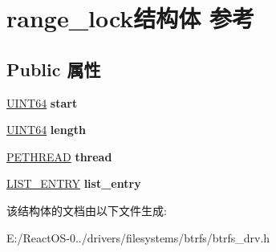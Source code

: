 \hypertarget{structrange__lock}{}\section{range\+\_\+lock结构体 参考}
\label{structrange__lock}
\subsection*{Public 属性}
\begin{DoxyCompactItemize}
\item 
\mbox{\label{structrange__lock_a7a90ddad1d2be804d6aa59edae72d569}} 
\hyperlink{_processor_bind_8h_a57be03562867144161c1bfee95ca8f7c}{U\+I\+N\+T64} {\bfseries start}
\item 
\mbox{\label{structrange__lock_a8213123c1aadea43db843ccc96a56d35}} 
\hyperlink{_processor_bind_8h_a57be03562867144161c1bfee95ca8f7c}{U\+I\+N\+T64} {\bfseries length}
\item 
\mbox{\label{structrange__lock_aea3fd3f65f6832aa48d80b672accdda5}} 
\hyperlink{struct___e_t_h_r_e_a_d}{P\+E\+T\+H\+R\+E\+AD} {\bfseries thread}
\item 
\mbox{\label{structrange__lock_af51805a7e970323c712ac9c816204fbb}} 
\hyperlink{struct___l_i_s_t___e_n_t_r_y}{L\+I\+S\+T\+\_\+\+E\+N\+T\+RY} {\bfseries list\+\_\+entry}
\end{DoxyCompactItemize}


该结构体的文档由以下文件生成\+:\begin{DoxyCompactItemize}
\item 
E\+:/\+React\+O\+S-\/0../drivers/filesystems/btrfs/btrfs\+\_\+drv.\+h\end{DoxyCompactItemize}
